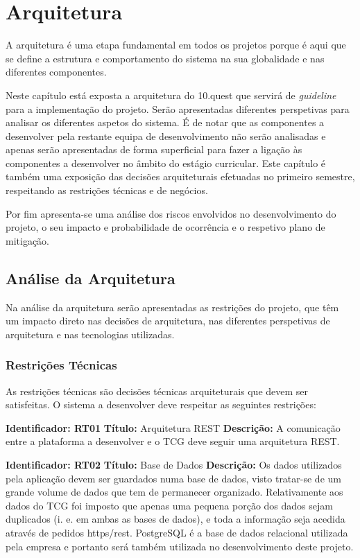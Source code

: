
\chapter{Arquitetura}
\label{sec:arquitetura}

A arquitetura é uma etapa fundamental em todos os projetos porque é aqui que se define a estrutura e comportamento do sistema na sua globalidade e nas diferentes componentes.

Neste capítulo está exposta a arquitetura do 10.quest que servirá de \textit{guideline} para a implementação do projeto. Serão apresentadas diferentes perspetivas para analisar os diferentes aspetos do sistema. É de notar que as componentes a desenvolver pela restante equipa de desenvolvimento não serão analisadas e apenas serão apresentadas de forma superficial para fazer a ligação às componentes a desenvolver no âmbito do estágio curricular.
Este capítulo é também uma exposição das decisões arquiteturais efetuadas no primeiro semestre, respeitando as restrições técnicas e de negócios.

Por fim apresenta-se uma análise dos riscos envolvidos no desenvolvimento do projeto, o seu impacto e probabilidade de ocorrência e o respetivo plano de mitigação.




\section{Análise da Arquitetura}
\label{analisearq}

Na análise da arquitetura serão apresentadas as restrições do projeto, que têm um impacto direto nas decisões de arquitetura, nas diferentes perspetivas de arquitetura e nas tecnologias utilizadas.

\subsection{Restrições Técnicas}
As restrições técnicas são decisões técnicas arquiteturais que devem ser satisfeitas. O sistema a desenvolver deve respeitar as seguintes restrições:

\textbf{Identificador: RT01}
\newline
\textbf{Título:} Arquitetura REST
\newline
\textbf{Descrição:} A comunicação entre a plataforma a desenvolver e o TCG deve seguir uma arquitetura REST.

\textbf{Identificador: RT02}
\newline
\textbf{Título:} Base de Dados
\newline
\textbf{Descrição:} Os dados utilizados pela aplicação devem ser guardados numa base de dados, visto tratar-se de um grande volume de dados que tem de permanecer organizado. Relativamente aos dados do TCG foi imposto que apenas uma pequena porção dos dados sejam duplicados (i. e. em ambas as bases de dados), e toda a informação seja acedida através de pedidos \acrshort{https}/\acrshort{rest}. PostgreSQL\cite{sql} é a base de dados relacional utilizada pela empresa e portanto será também utilizada no desenvolvimento deste projeto.

